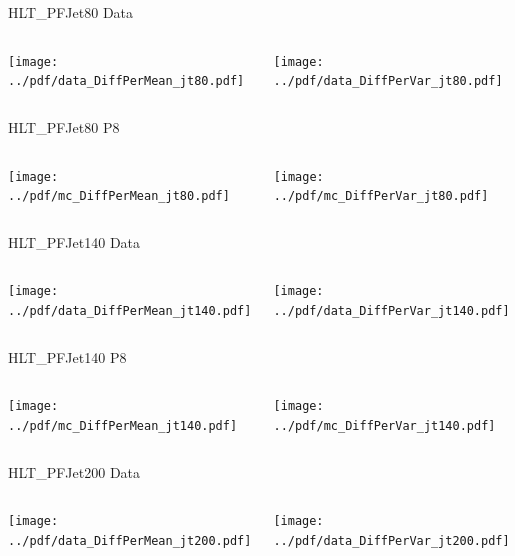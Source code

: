 \documentclass[9pt]{beamer}
\begin{document}
\begin{frame}[t]{HLT\_PFJet80 Data}
\begin{columns}[T]
  \begin{column}{.5\textwidth}
  \texttt{[image: ../pdf/data\_DiffPerMean\_jt80.pdf]}
  \end{column}
  \begin{column}{.5\textwidth}
  \texttt{[image: ../pdf/data\_DiffPerVar\_jt80.pdf]}
  \end{column}
\end{columns}
\end{frame}

\begin{frame}[t]{HLT\_PFJet80 P8}
\begin{columns}[T]
  \begin{column}{.5\textwidth}
  \texttt{[image: ../pdf/mc\_DiffPerMean\_jt80.pdf]}
  \end{column}
  \begin{column}{.5\textwidth}
  \texttt{[image: ../pdf/mc\_DiffPerVar\_jt80.pdf]}
  \end{column}
\end{columns}
\end{frame}

\begin{frame}[t]{HLT\_PFJet140 Data}
\begin{columns}[T]
  \begin{column}{.5\textwidth}
  \texttt{[image: ../pdf/data\_DiffPerMean\_jt140.pdf]}
  \end{column}
  \begin{column}{.5\textwidth}
  \texttt{[image: ../pdf/data\_DiffPerVar\_jt140.pdf]}
  \end{column}
\end{columns}
\end{frame}

\begin{frame}[t]{HLT\_PFJet140 P8}
\begin{columns}[T]
  \begin{column}{.5\textwidth}
  \texttt{[image: ../pdf/mc\_DiffPerMean\_jt140.pdf]}
  \end{column}
  \begin{column}{.5\textwidth}
  \texttt{[image: ../pdf/mc\_DiffPerVar\_jt140.pdf]}
  \end{column}
\end{columns}
\end{frame}

\begin{frame}[t]{HLT\_PFJet200 Data}
\begin{columns}[T]
  \begin{column}{.5\textwidth}
  \texttt{[image: ../pdf/data\_DiffPerMean\_jt200.pdf]}
  \end{column}
  \begin{column}{.5\textwidth}
  \texttt{[image: ../pdf/data\_DiffPerVar\_jt200.pdf]}
  \end{column}
\end{columns}
\end{frame}
\end{document}
